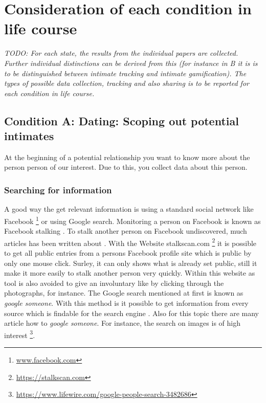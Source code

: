 \section{Consideration of each condition in life course}
\label{sec:consideration_life_course_conditions}

\textit{TODO: For each state, the results from the individual papers are collected.
Further individual distinctions can be derived from this (for instance in B it is is to be distinguished between intimate tracking and intimate gamification).
The types of possible data collection, tracking and also sharing is to be reported for each condition in life course.}

\subsection{Condition A: Dating: Scoping out potential intimates}
\label{subsec:A}
At the beginning of a potential relationship you want to know more about the person person of our interest. Due to this, you collect data about this person. 
\subsubsection{Searching for information}
A good way the get relevant information is using a standard social network like Facebook \footnote{\url{www.facebook.com}} or using Google search. Monitoring a person on Facebook is known as Facebook stalking \cite{levy2014intimate}. To stalk another person on Facebook undiscovered, much articles has been written about \cite{sueddeutsche_fb_stalking}. With the Website stalkscan.com \footnote{\url{https://stalkscan.com}} it is possible to get all public entries from a persons Facebook profile site which is public by only one mouse click. Surley, it can only shows what is already set public, still it make it more easily to stalk another person very quickly.
Within this website as tool is also avoided to give an involuntary like by clicking through the photographs, for instance.
The Google search mentioned at first is known as \textit{google someone}. With this method is it possible to get information from every source which is findable for the search engine \cite{nolan2005hacking}. Also for this topic there are many article how to \textit{google someone}. For instance, the search on images is of high interest \footnote{\url{https://www.lifewire.com/google-people-search-3482686}}.
